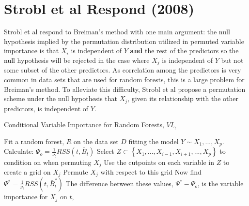 \documentclass[12pt,twoside]{reedthesis}
\begin{document}
  \section{Strobl et al Respond (2008)}\label{strobl-et-al-respond-2008}
  
  Strobl et al respond to Breiman's method with one main argument: the
  null hypothesis implied by the permutation distribution utilized in
  permuted variable importance is that \(X_i\) is independent of \(Y\)
  \textbf{and} the rest of the predictors so the null hypothesis will be
  rejected in the case where \(X_j\) is independent of \(Y\) but not some
  subset of the other predictors. As correlation among the predictors is
  very common in data sets that are used for random forests, this is a
  large problem for Breiman's method. To alleviate this difficulty, Strobl
  et al propose a permutation scheme under the null hypothesis that
  \(X_j\), given its relationship with the other predictors, is
  independent of \(Y\).
  
  \begin{algorithm}
  \caption{Conditional Variable Importance for Random Forests, $VI_{\gamma}$}
  \label{strobl}
  \begin{algorithmic}[1]
  \State Fit a random forest, $R$ on the data set $D$ fitting the model $Y \sim X_1,...,X_p$.
  \State Calculate: $\Psi_o =  \frac 1 {\nu_t} RSS(t,\bar{B}_t)$
  \State Select $Z \subset \left \{ X_1,...,X_{i-1}, X_{i+1},...,X_p \right \}$ to condition on when permuting $X_j$
  \State Use the cutpoints on each variable in $Z$ to create a grid on $X_j$
  \State Permute $X_j$ with respect to this grid
  \State Now find $\Psi^* =  \frac 1 {\nu_t} RSS(t,\bar{B}_t^*)$
  \State The difference between these values, $\Psi^* - \Psi_o$,  is the variable importance for $X_j$ on $t$,  
  \EndFor
  \EndFor
  \end{algorithmic}
  \end{algorithm}
  
\end{document}
